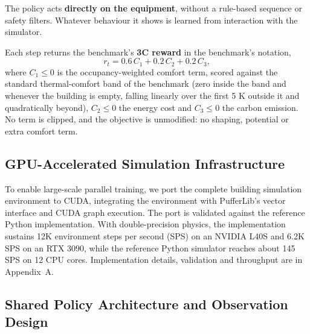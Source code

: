 \documentclass{article}
\begin{document}
The policy acts \textbf{directly on the equipment}, without a rule-based sequence or safety filters. Whatever behaviour it shows is learned from interaction with the simulator.

{\samepage
Each step returns the benchmark's \textbf{3C reward} in the benchmark's notation,
\[
r_t = 0.6\,C_1 + 0.2\,C_2 + 0.2\,C_3,
\]
where $C_1 \le 0$ is the occupancy-weighted comfort term, scored against the standard thermal-comfort band of the benchmark \citep{ashrae55} (zero inside the band and whenever the building is empty, falling linearly over the first 5 K outside it and quadratically beyond), $C_2 \le 0$ the energy cost and $C_3 \le 0$ the carbon emission. No term is clipped, and the objective is unmodified: no shaping, potential or extra comfort term.
}


\subsection{GPU-Accelerated Simulation Infrastructure}

To enable large-scale parallel training, we port the complete building simulation environment to CUDA, integrating the environment with PufferLib's vector interface \citep{suarez2024pufferlib} and CUDA graph execution. The port is validated against the reference Python implementation. With double-precision physics, the implementation sustains 12K environment steps per second (SPS) on an NVIDIA L40S and 6.2K SPS on an RTX 3090, while the reference Python simulator reaches about 145 SPS on 12 CPU cores. Implementation details, validation and throughput are in Appendix~A.

\subsection{Shared Policy Architecture and Observation Design}
\end{document}
